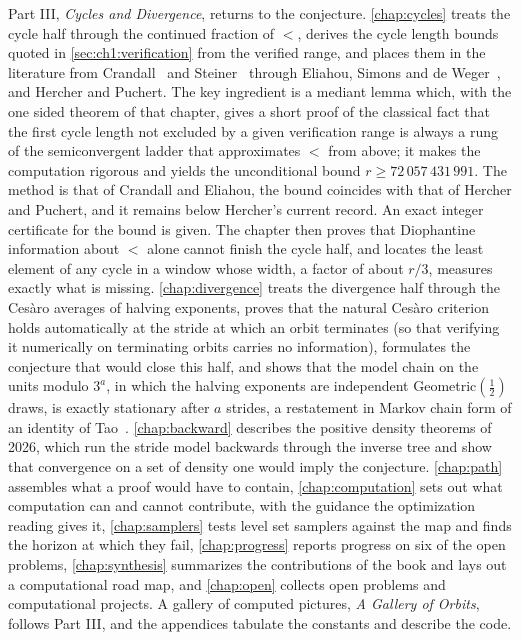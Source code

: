 Part III, \emph{Cycles and Divergence}, returns to the conjecture.
\cref{chap:cycles} treats the cycle half through the continued fraction of
$\lt$, derives the cycle length bounds quoted in \cref{sec:ch1:verification}
from the verified range, and places them in the literature from
Crandall~\cite{crandall1978} and Steiner~\cite{steiner1977} through Eliahou, Simons and de
Weger~\cite{simons2005}, and Hercher and Puchert. The key ingredient is a mediant lemma
which, with the one sided theorem of that chapter, gives a short proof of the classical fact that the first cycle length not excluded
by a given verification range is always a rung of the semiconvergent ladder
that approximates $\lt$ from above; it makes the computation rigorous and yields the
unconditional bound $r\geq72\,057\,431\,991$. The method is that of Crandall
and Eliahou, the bound coincides with that of Hercher and Puchert, and it
remains below Hercher's current record. An exact integer certificate for the bound is given. The chapter then
proves that Diophantine information about $\lt$ alone cannot finish the cycle half, and locates
the least element of any cycle in a window whose width, a factor of about
$r/3$, measures exactly what is missing. \cref{chap:divergence} treats the divergence half
through the Ces\`aro averages of halving exponents, proves that the natural
Ces\`aro criterion holds automatically at the stride at which an orbit terminates (so that verifying it numerically on terminating orbits carries no information), formulates the
conjecture that would close this half, and shows that the model chain on
the units modulo $3^a$, in which the halving exponents are independent
Geometric$(\tfrac12)$ draws, is exactly stationary after $a$ strides, a
restatement in Markov chain form of an identity of
Tao~\cite[eq.~(1.21)]{tao2022}. \cref{chap:backward} describes the positive density theorems of 2026, which run the stride model backwards through the inverse tree and show that convergence on a set of density one would imply the conjecture. \cref{chap:path} assembles what a proof would have
to contain, \cref{chap:computation} sets out what computation can and cannot contribute, with the guidance the optimization reading gives it, \cref{chap:samplers} tests level set samplers against the map and finds the horizon at which they fail, \cref{chap:progress} reports progress on six of the open problems, \cref{chap:synthesis} summarizes the contributions of the book and lays out a computational road map, and \cref{chap:open} collects open problems and computational
projects.
A gallery of computed pictures, \emph{A Gallery of Orbits}, follows Part III, and the appendices tabulate the constants and describe the code.

